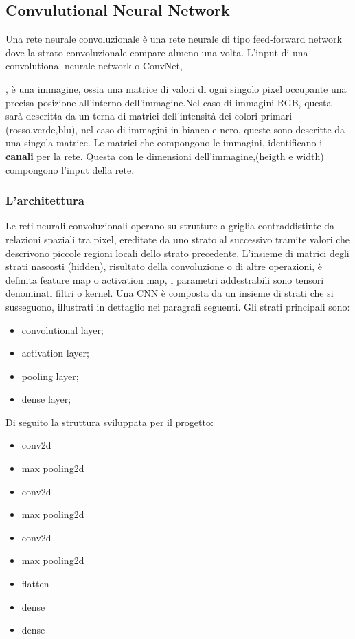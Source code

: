 \documentclass[14pt]{extarticle}
\begin{document}
\subsection{Convulutional Neural Network}
Una rete neurale convoluzionale è una rete neurale di tipo feed-forward network dove la strato convoluzionale compare almeno una volta.
L'input di una convolutional neurale network o ConvNet, , è una immagine, ossia una matrice di valori di ogni singolo pixel occupante una precisa posizione all'interno dell'immagine.Nel caso di immagini RGB, questa sarà descritta da un terna di matrici dell'intensità dei colori primari (rosso,verde,blu), nel caso di immagini in bianco e nero, queste sono descritte da una singola matrice. Le matrici che compongono le immagini, identificano i \textbf{canali} per la rete. Questa con le dimensioni dell'immagine,(heigth e width) compongono l'input della rete.
\subsubsection{L'architettura} 
Le reti neurali convoluzionali operano su strutture a griglia contraddistinte da relazioni spaziali tra pixel, ereditate da uno strato al successivo tramite valori che descrivono
piccole regioni locali dello strato precedente. L’insieme di matrici degli strati nascosti (hidden), risultato della convoluzione o di altre operazioni, è definita feature map o activation map, i parametri addestrabili sono tensori denominati filtri o kernel.
Una CNN è composta da  un insieme di strati che si susseguono, illustrati in dettaglio nei paragrafi seguenti. Gli strati principali sono:
\begin{itemize}
\item convolutional layer;
\item activation layer;
\item pooling layer;
\item dense layer;
\end{itemize}
\cite{torresin2019sviluppo}
Di seguito la struttura sviluppata per il progetto:
\begin{itemize}
	\item conv2d
	\item max pooling2d
	\item conv2d
	\item max pooling2d
	\item conv2d
	\item max pooling2d
	\item flatten
	\item dense
	\item dense
\end{itemize}
\end{document}

